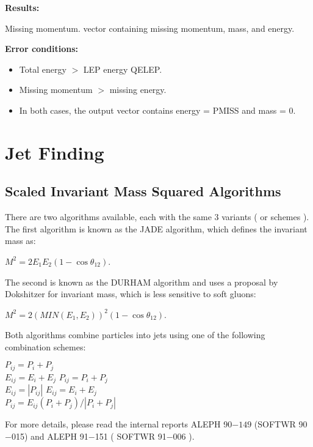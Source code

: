 {\bf Results:}
\begin{indentlist}{ 4.25cm}{ 4.50cm}
Missing momentum.
vector containing missing
momentum,
mass, and energy.
\end{indentlist}
 
{\bf Error conditions:}
\begin{itemize}
\item Total energy $>$ LEP energy QELEP.
\item Missing momentum $>$ missing energy.
\item In both cases, the
output vector contains energy = PMISS and mass = 0.
\end{itemize}
\section{\label{sec-QJMM}Jet Finding}
\par
\subsection{\label{sec-QJSIM}Scaled Invariant Mass Squared Algorithms}
\par
There are two algorithms available, each with the same 3 variants ( or schemes ).
The first algorithm is known as the JADE algorithm, which defines the invariant mass as:
\par
                                      $ M^{2}= 2E_{1}E_{2}(1-\cos \theta _{12}) $.
\par
The second is known as the DURHAM algorithm and uses a proposal by Dokshitzer for invariant mass,
which is less sensitive to soft gluons:
\par
                                      $ M^{2}= 2(MIN(E_{1},E_{2}))^{2}(1-\cos \theta _{12}) $.
 
\par
Both algorithms combine particles into jets using one of the following combination schemes:
\begin{indentlist}{ 2.50cm}{ 2.75cm}
$ P_{ij} = P_i + P_j $\\
                       $ E_{ij} = E_i + E_j $
$ P_{ij} = P_i + P_j $\\
                       $ E_{ij} = |P_{ij}| $
$ E_{ij} = E_i + E_j $\\
                       $ P_{ij} = E_{ij}(P_i+P_j)/|P_i+P_j| $
\end{indentlist}
\par
For more details, please read the internal reports ALEPH 90$-149$ (SOFTWR 90$-$015)  and
 ALEPH 91$-$151 ( SOFTWR 91$-$006 ).
 
